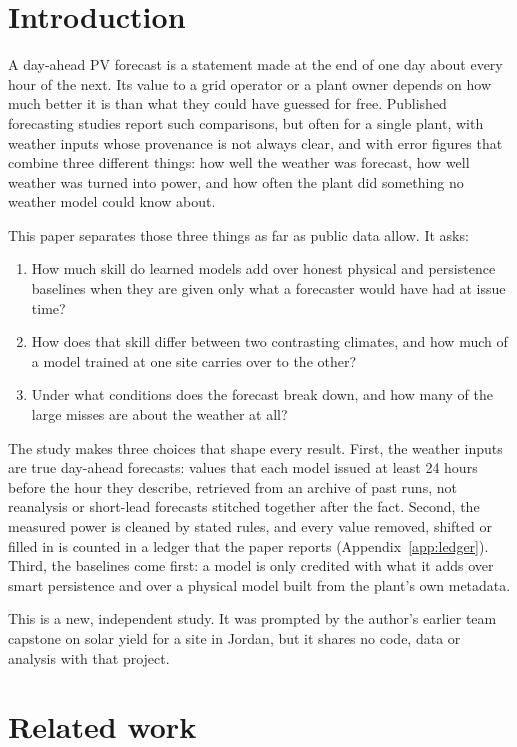 \documentclass[11pt]{article}
\begin{document}
\vspace{0.4em}
\section{Introduction}

A day-ahead PV forecast is a statement made at the end of one day about every hour of the next. Its value to a grid operator or a plant owner depends on how much better it is than what they could have guessed for free. Published forecasting studies report such comparisons, but often for a single plant, with weather inputs whose provenance is not always clear, and with error figures that combine three different things: how well the weather was forecast, how well weather was turned into power, and how often the plant did something no weather model could know about.

This paper separates those three things as far as public data allow. It asks:
\begin{enumerate}
\item How much skill do learned models add over honest physical and persistence baselines when they are given only what a forecaster would have had at issue time?
\item How does that skill differ between two contrasting climates, and how much of a model trained at one site carries over to the other?
\item Under what conditions does the forecast break down, and how many of the large misses are about the weather at all?
\end{enumerate}

The study makes three choices that shape every result. First, the weather inputs are true day-ahead forecasts: values that each model issued at least 24 hours before the hour they describe, retrieved from an archive of past runs, not reanalysis or short-lead forecasts stitched together after the fact. Second, the measured power is cleaned by stated rules, and every value removed, shifted or filled in is counted in a ledger that the paper reports (Appendix~\ref{app:ledger}). Third, the baselines come first: a model is only credited with what it adds over smart persistence and over a physical model built from the plant's own metadata.

This is a new, independent study. It was prompted by the author's earlier team capstone on solar yield for a site in Jordan, but it shares no code, data or analysis with that project.

\section{Related work}
\end{document}

